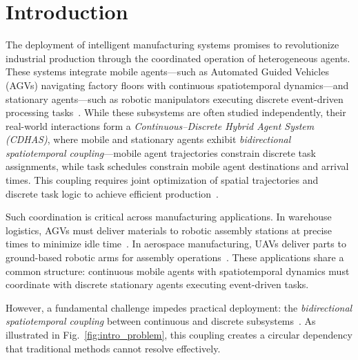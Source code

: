 \documentclass[manuscript,screen,review]{acmart}
\begin{document}

\maketitle
\section{Introduction}
\label{sec:Chapter_I}

The deployment of intelligent manufacturing systems promises to revolutionize 
industrial production through the coordinated operation of heterogeneous agents. 
These systems integrate mobile agents—such as Automated Guided Vehicles (AGVs) 
navigating factory floors with continuous spatiotemporal dynamics—and stationary 
agents—such as robotic manipulators executing discrete event-driven processing 
tasks~\cite{leitao2009agent, chryssolouris2023artificial}. While these subsystems 
are often studied independently, their real-world interactions form a 
\textit{Continuous–Discrete Hybrid Agent System (CDHAS)}, where mobile and 
stationary agents exhibit \textit{bidirectional spatiotemporal coupling}—mobile 
agent trajectories constrain discrete task assignments, while task schedules 
constrain mobile agent destinations and arrival times. This coupling requires 
joint optimization of spatial trajectories and discrete task logic to achieve 
efficient production~\cite{giordani2013distributed}.

Such coordination is critical across manufacturing applications. In warehouse 
logistics, AGVs must deliver materials to robotic assembly stations at precise 
times to minimize idle time~\cite{ellithy2024agv}. In aerospace manufacturing, 
UAVs deliver parts to ground-based robotic arms for assembly operations~\cite{saunders2024autonomous}. 
These applications share a common structure: continuous mobile agents with 
spatiotemporal dynamics must coordinate with discrete stationary agents executing 
event-driven tasks.

However, a fundamental challenge impedes practical deployment: the \textit{bidirectional 
spatiotemporal coupling} between continuous and discrete subsystems~\cite{senkul2002logical}. 
As illustrated in Fig.~\ref{fig:intro_problem}, this coupling creates a circular 
dependency that traditional methods cannot resolve effectively.
\end{document}
